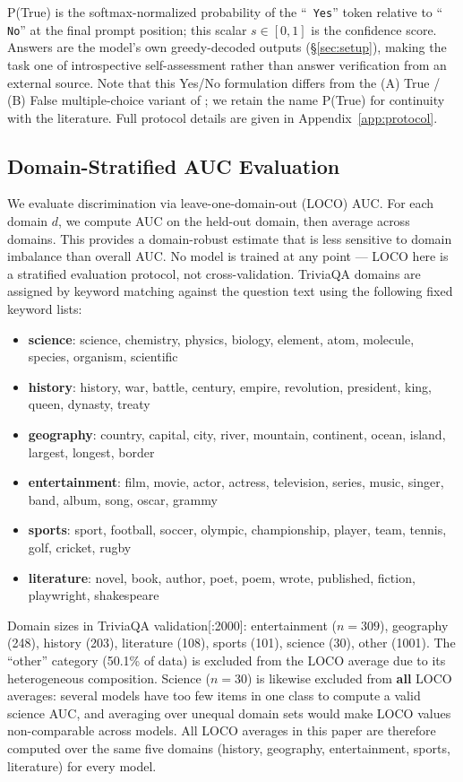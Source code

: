 \documentclass[11pt]{article}
\begin{document}
P(True) is the softmax-normalized probability of the ``\texttt{ Yes}'' token relative to ``\texttt{ No}'' at the final prompt position; this scalar $s \in [0,1]$ is the confidence score. Answers are the model's own greedy-decoded outputs (\S\ref{sec:setup}), making the task one of introspective self-assessment rather than answer verification from an external source. Note that this Yes/No formulation differs from the (A) True / (B) False multiple-choice variant of \citet{kadavath2022}; we retain the name P(True) for continuity with the literature. Full protocol details are given in Appendix~\ref{app:protocol}.

\subsection{Domain-Stratified AUC Evaluation}

We evaluate discrimination via leave-one-domain-out (LOCO) AUC. For each domain $d$, we compute AUC on the held-out domain, then average across domains. This provides a domain-robust estimate that is less sensitive to domain imbalance than overall AUC. No model is trained at any point --- LOCO here is a stratified evaluation protocol, not cross-validation. TriviaQA domains are assigned by keyword matching against the question text using the following fixed keyword lists:

\begin{itemize}
  \item \textbf{science}: science, chemistry, physics, biology, element, atom, molecule, species, organism, scientific
  \item \textbf{history}: history, war, battle, century, empire, revolution, president, king, queen, dynasty, treaty
  \item \textbf{geography}: country, capital, city, river, mountain, continent, ocean, island, largest, longest, border
  \item \textbf{entertainment}: film, movie, actor, actress, television, series, music, singer, band, album, song, oscar, grammy
  \item \textbf{sports}: sport, football, soccer, olympic, championship, player, team, tennis, golf, cricket, rugby
  \item \textbf{literature}: novel, book, author, poet, poem, wrote, published, fiction, playwright, shakespeare
\end{itemize}

Domain sizes in TriviaQA validation[:2000]: entertainment ($n=309$), geography (248), history (203), literature (108), sports (101), science (30), other (1001). The ``other'' category (50.1\% of data) is excluded from the LOCO average due to its heterogeneous composition. Science ($n=30$) is likewise excluded from \textbf{all} LOCO averages: several models have too few items in one class to compute a valid science AUC, and averaging over unequal domain sets would make LOCO values non-comparable across models. All LOCO averages in this paper are therefore computed over the same five domains (history, geography, entertainment, sports, literature) for every model.
\end{document}
